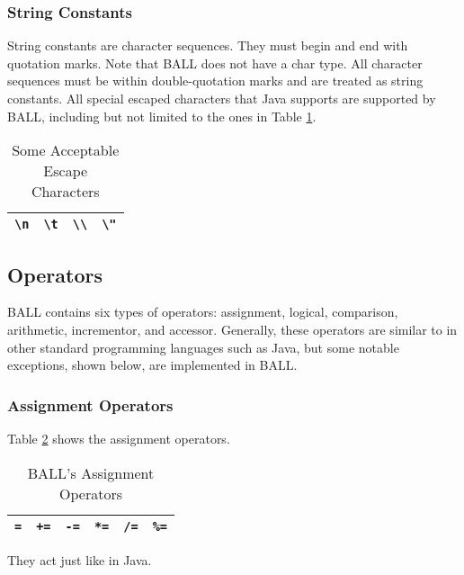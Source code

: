 \subsubsection{String Constants}
String constants are character sequences. They must begin and end with quotation marks. Note that BALL does not have a char type. All character sequences must be within double-quotation marks and are treated as string constants. All special escaped characters that Java supports are supported by BALL, including but not limited to the ones in Table \ref{escape}.
\begin{table}[htdp]
\begin{center}
\begin{tabular}{|c|c|c|c|}
\hline
\texttt{\textbackslash n} & \texttt{\textbackslash t} & \texttt{\textbackslash \textbackslash} & \texttt{\textbackslash "}\\
\hline
\end{tabular}
\caption{Some Acceptable Escape Characters}\label{escape}
\end{center}
\end{table}%

\subsection{Operators}
BALL contains six types of operators: assignment, logical, comparison, arithmetic, incrementor, and accessor. Generally, these operators are similar to in other standard programming languages such as Java, but some notable exceptions, shown below, are implemented in BALL.

\subsubsection{Assignment Operators}
Table \ref{assigntable} shows the assignment operators.
\begin{table}[htdp]
\begin{center}
\begin{tabular}{|c|c|c|c|c|c|}
\hline
\texttt{=} & \texttt{+=} & \texttt{-=} & \texttt{*=} & \texttt{/=} & \texttt{\%=}\\
\hline
\end{tabular}
\caption{BALL's Assignment Operators}\label{assigntable}
\end{center}
\end{table}%
They act just like in Java.

